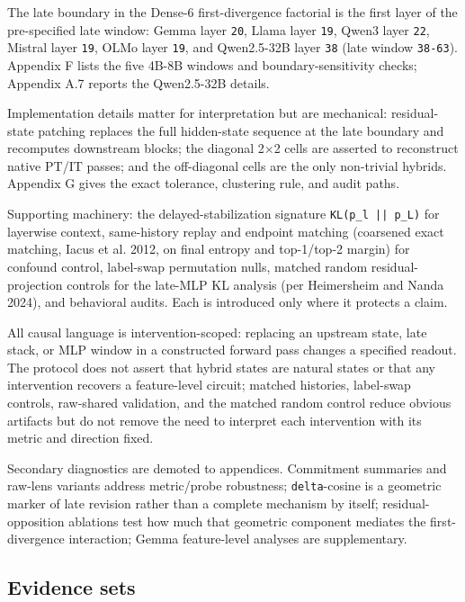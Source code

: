\documentclass[11pt]{article}
\begin{document}
The late boundary in the Dense-6 first-divergence factorial is the first layer of the pre-specified late window: Gemma layer \texttt{20}, Llama layer \texttt{19}, Qwen3 layer \texttt{22}, Mistral layer \texttt{19}, OLMo layer \texttt{19}, and Qwen2.5-32B layer \texttt{38} (late window \texttt{38-63}). Appendix F lists the five 4B-8B windows and boundary-sensitivity checks; Appendix A.7 reports the Qwen2.5-32B details.

Implementation details matter for interpretation but are mechanical: residual-state patching replaces the full hidden-state sequence at the late boundary and recomputes downstream blocks; the diagonal 2\ensuremath{\times}2 cells are asserted to reconstruct native PT/IT passes; and the off-diagonal cells are the only non-trivial hybrids. Appendix G gives the exact tolerance, clustering rule, and audit paths.

Supporting machinery: the delayed-stabilization signature \texttt{KL(p\_l || p\_L)} for layerwise context, same-history replay and endpoint matching (coarsened exact matching, Iacus et al. 2012, on final entropy and top-1/top-2 margin) for confound control, label-swap permutation nulls, matched random residual-projection controls for the late-MLP KL analysis (per Heimersheim and Nanda 2024), and behavioral audits. Each is introduced only where it protects a claim.

All causal language is intervention-scoped: replacing an upstream state, late stack, or MLP window in a constructed forward pass changes a specified readout. The protocol does not assert that hybrid states are natural states or that any intervention recovers a feature-level circuit; matched histories, label-swap controls, raw-shared validation, and the matched random control reduce obvious artifacts but do not remove the need to interpret each intervention with its metric and direction fixed.

Secondary diagnostics are demoted to appendices. Commitment summaries and raw-lens variants address metric/probe robustness; \texttt{delta}-cosine is a geometric marker of late revision rather than a complete mechanism by itself; residual-opposition ablations test how much that geometric component mediates the first-divergence interaction; Gemma feature-level analyses are supplementary.

\subsection{Evidence sets}
\end{document}
